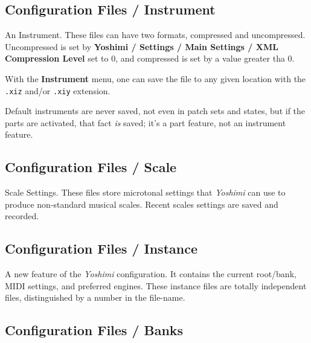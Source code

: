 \subsection{Configuration Files / Instrument}
\label{subsec:configuration_instrument}

   An Instrument.  These files can have two formats, compressed and
   uncompressed.
   Uncompressed is set by
   \textbf{Yoshimi / Settings / Main Settings / XML Compression Level} set to
   0, and compressed is set by a value greater tha 0.

   With the \textbf{Instrument} menu, one can save the file to any
   given location with the \texttt{.xiz} and/or \texttt{.xiy} extension.

   Default instruments are never saved, not even in patch sets and states, but
   if the parts are activated, that fact \textsl{is} saved; it's a part
   feature, not an instrument feature.

\subsection{Configuration Files / Scale}
\label{subsec:configuration_scale}

   Scale Settings.  These files store microtonal settings that \textsl{Yoshimi}
   can use to produce non-standard musical scales.  Recent scales settings are
   saved and recorded.



\subsection{Configuration Files / Instance}
\label{subsec:configuration_instance}

   A new feature of the \textsl{Yoshimi} configuration.
   It contains the current root/bank, MIDI settings, and preferred engines.
   These instance files are totally independent files, distinguished by a number
   in the file-name.

\subsection{Configuration Files / Banks}
\label{subsec:configuration_banks}

